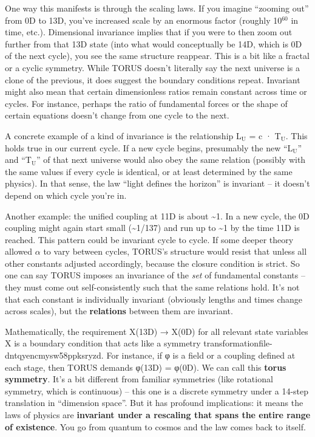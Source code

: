 \documentclass[]{article}
\newcommand{\subscript}[1]{\ensuremath{_{\mathrm{#1}}}}
\newcommand{\superscript}[1]{\ensuremath{^{\mathrm{#1}}}}
\begin{document}
One way this manifests is through the scaling laws. If you imagine
``zooming out'' from 0D to 13D, you've increased scale by an enormous
factor (roughly 10\superscript{60} in time, etc.). Dimensional invariance implies
that if you were to then zoom out further from that 13D state (into what
would conceptually be 14D, which is 0D of the next cycle), you see the
same structure reappear. This is a bit like a fractal or a cyclic
symmetry. While TORUS doesn't literally say the next universe is a clone
of the previous, it does suggest the boundary conditions repeat.
Invariant might also mean that certain dimensionless ratios remain
constant across time or cycles. For instance, perhaps the ratio of
fundamental forces or the shape of certain equations doesn't change from
one cycle to the next.

A concrete example of a kind of invariance is the relationship
L\subscript{U} = c ·
T\subscript{U}. This holds
true in our current cycle. If a new cycle begins, presumably the new
``L\subscript{U}'' and
``T\subscript{U}'' of that
next universe would also obey the same relation (possibly with the same
values if every cycle is identical, or at least determined by the same
physics). In that sense, the law ``light defines the horizon'' is
invariant -- it doesn't depend on which cycle you're in.

Another example: the unified coupling at 11D is about
\textasciitilde{}1. In a new cycle, the 0D coupling might again start
small (\textasciitilde{}1/137) and run up to \textasciitilde{}1 by the
time 11D is reached. This pattern could be invariant cycle to cycle. If
some deeper theory allowed $\alpha$ to vary between cycles, TORUS's structure
would resist that unless all other constants adjusted accordingly,
because the closure condition is strict. So one can say TORUS imposes an
invariance of the \emph{set} of fundamental constants -- they must come
out self-consistently such that the same relations hold. It's not that
each constant is individually invariant (obviously lengths and times
change across scales), but the \textbf{relations} between them are
invariant.

Mathematically, the requirement X(13D) → X(0D) for all relevant state
variables X is a boundary condition that acts like a symmetry
transformation​file-dntqyencmysw58ppksryzd. For instance, if φ is a
field or a coupling defined at each stage, then TORUS demands φ(13D) =
φ(0D). We can call this \textbf{torus symmetry}. It's a bit different
from familiar symmetries (like rotational symmetry, which is continuous)
-- this one is a discrete symmetry under a 14-step translation in
``dimension space''. But it has profound implications: it means the laws
of physics are \textbf{invariant under a rescaling that spans the entire
range of existence}. You go from quantum to cosmos and the law comes
back to itself.
\end{document}
